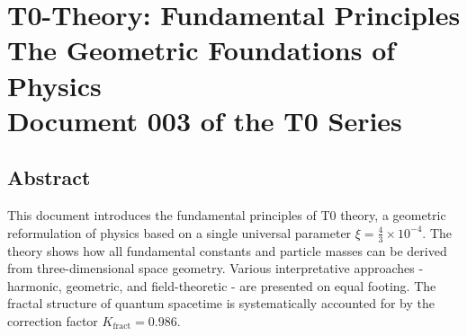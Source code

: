 \chapter{\textbf{T0-Theory: Fundamental Principles}\\[0.5cm]
	 The Geometric Foundations of Physics\\[0.3cm]
	\normalsize Document 003 of the T0 Series}

	
	
\section*{Abstract}
		This document introduces the fundamental principles of T0 theory, a geometric reformulation of physics based on a single universal parameter $\xi = \frac{4}{3} \times 10^{-4}$. The theory shows how all fundamental constants and particle masses can be derived from three-dimensional space geometry. Various interpretative approaches - harmonic, geometric, and field-theoretic - are presented on equal footing. The fractal structure of quantum spacetime is systematically accounted for by the correction factor $K_{\text{fract}} = 0.986$.

